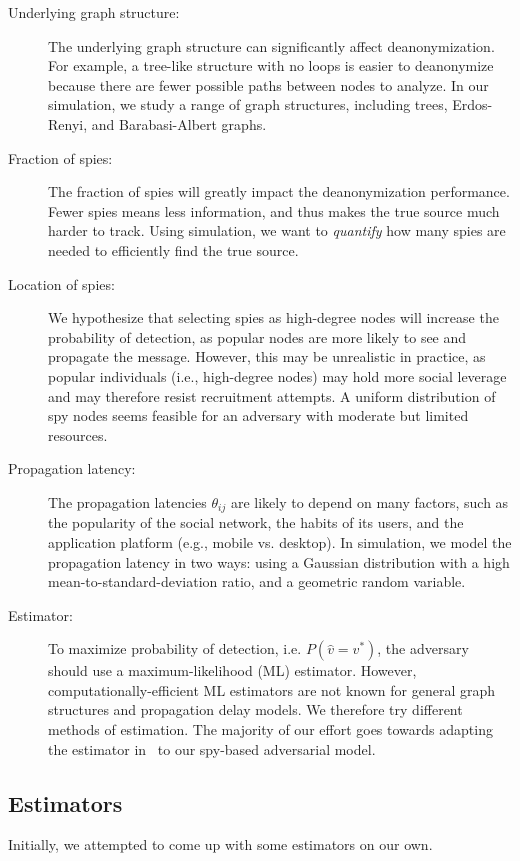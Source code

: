 \begin{description}
\vspace{-0.1in}
\item[Underlying graph structure:] The underlying graph structure can significantly affect deanonymization. For example, a tree-like structure with no loops is easier to deanonymize because there are fewer possible paths between nodes to analyze. In our simulation, we study a range of graph structures, including trees, Erdos-Renyi, and Barabasi-Albert graphs.
\item[Fraction of spies:] The fraction of spies will greatly impact the deanonymization performance. Fewer spies means less information, and thus makes the true source much harder to track. Using simulation, we want to \emph{quantify} how many spies are needed to efficiently find the true source.
\item[Location of spies:] We hypothesize that selecting spies as high-degree nodes will increase the probability of detection, as popular nodes are more likely to see and propagate the message. However, this may be unrealistic in practice, as popular individuals (i.e., high-degree nodes) may hold more social leverage and may therefore resist recruitment attempts. A uniform distribution of spy nodes seems feasible for an adversary with moderate but limited resources. 
\item[Propagation latency:] The propagation latencies $\theta_{ij}$ are likely to depend on many factors, such as the popularity of the social network, the habits of its users, and the application platform (e.g., mobile vs. desktop).
In simulation, we model the propagation latency in two ways: using a Gaussian distribution with a high mean-to-standard-deviation ratio, and a geometric random variable. 
\item[Estimator:] To maximize probability of detection, i.e. $P(\hat v=v^*)$, the adversary should use a maximum-likelihood (ML) estimator. However, computationally-efficient ML estimators are not known for general graph structures and propagation delay models. We therefore try different methods of estimation. The majority of our effort goes towards adapting the estimator in~\cite{pinto} to our spy-based adversarial model.
\end{description}

\subsection{Estimators}
Initially, we attempted to come up with some estimators on our own.



